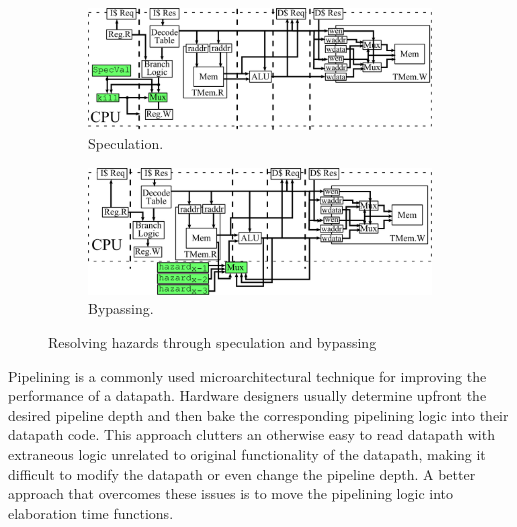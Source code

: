 \begin{figure}[htb]
\centering
  \begin{subfigure}[t]{0.8\textwidth}
  \centering
  \includegraphics[width=\textwidth]{figures/pipelinespec.pdf}
  \caption{Speculation.}
  \label{fig:spec}
  \end{subfigure}
  \begin{subfigure}[t]{0.8\textwidth}
  \vspace{20pt}
  \centering
  \includegraphics[width=\textwidth]{figures/pipelinebypass.pdf}
  \caption{Bypassing.}
  \label{fig:bypass}
  \end{subfigure}
\caption{Resolving hazards through speculation and bypassing}
\label{fig:specbyp}
\end{figure}

Pipelining is a commonly used microarchitectural technique for
improving the performance of a datapath. Hardware designers usually
determine upfront the desired pipeline depth and then bake the
corresponding pipelining logic into their datapath code. This approach
clutters an otherwise easy to read datapath with extraneous logic
unrelated to original functionality of the datapath, making it
difficult to modify the datapath or even change the pipeline depth. A
better approach that overcomes these issues is to move the pipelining
logic into elaboration time functions.

